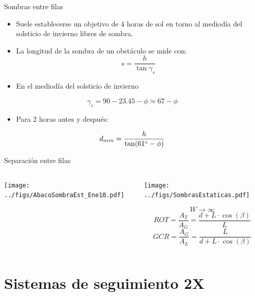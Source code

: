 \documentclass[aspectratio=169, usenames,svgnames,dvipsnames]{beamer}
\begin{document}
\begin{frame}[label={sec:org55f3274}]{Sombras entre filas}
\begin{itemize}
\item Suele establecerse un objetivo de \alert{4 horas de sol en torno al mediodía del solsticio de invierno libres de sombra}.

\item La longitud de la sombra de un obstáculo se mide con:$$s=\frac{h}{\tan\gamma_{s}}$$

\item En el mediodía del solsticio de invierno
\end{itemize}
$$\gamma_{s}=90-23.45-\phi\simeq67-\phi$$ 

\begin{itemize}
\item Para 2 horas antes y después:
\end{itemize}
$$d_{min}=\frac{h}{\tan(61\degree-\phi)}$$
\end{frame}
\begin{frame}[label={sec:org68c7b6c}]{Separación entre filas}
\begin{columns}
\begin{column}{0.5\columnwidth}
\begin{center}
\texttt{[image: ../figs/AbacoSombraEst\_Ene10.pdf]}
\end{center}
\end{column}



\begin{column}{0.5\columnwidth}
\begin{center}
\texttt{[image: ../figs/SombrasEstaticas.pdf]}
\end{center}
\[
W \to \infty\]
\[
  ROT=\frac{A_T}{A_G}=\frac{d+L \cdot \cos(\beta)}{L}
\]
\[
  GCR=\frac{A_G}{A_L}=\frac{L}{d+L \cdot \cos(\beta)}
\]
\end{column}
\end{columns}
\end{frame}


\section{Sistemas de seguimiento 2X}
\label{sec:orgb477a0d}
\end{document}
